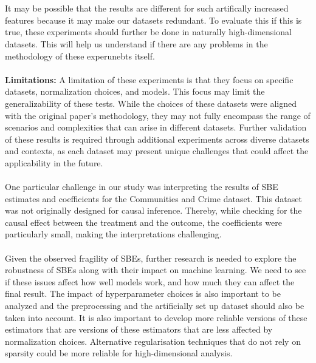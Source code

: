 \\
\\
It may be possible that the results are different for such artifically increased features because it may make our datasets redundant. To evaluate this if this is true, these experiments should further be done in naturally high-dimensional datasets. This will help us understand if there are any problems in the methodology of these experunebts itself. \\
\\
\textbf{Limitations:} A limitation of these experiments is that they focus on specific datasets, normalization choices, and models. This focus may limit the generalizability of these tests. While the choices of these datasets were aligned with the original paper's methodology, they may not fully encompass the range of scenarios and complexities that can arise in different datasets. Further validation of these results is required through additional experiments across diverse datasets and contexts, as each dataset may present unique challenges that could affect the applicability in the future. \\
\\
One particular challenge in our study was interpreting the results of SBE estimates and coefficients for the Communities and Crime dataset. This dataset was not originally designed for causal inference. Thereby, while checking for the causal effect between the treatment and the outcome, the coefficients were particularly small, making the interpretations challenging.\\
\\
Given the observed fragility of SBEs, further research is needed to explore the robustness of SBEs along with their impact on machine learning. We need to see if these issues affect how well models work, and how much they can affect the final result. The impact of hyperparameter choices is also important to be analyzed and the preprocessing and the artificially set up dataset should also be taken into account. It is also important to develop more reliable versions of these estimators that are versions of these estimators that are less affected by normalization choices. Alternative regularisation techniques that do not rely on sparsity could be more reliable for high-dimensional analysis.

